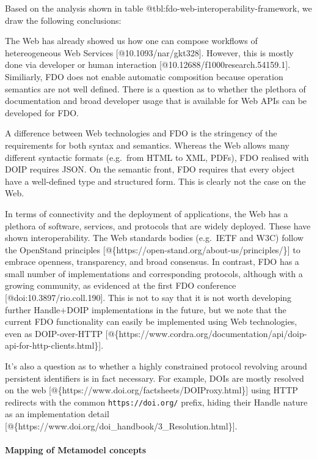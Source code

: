 Based on the analysis shown in table
@tbl:fdo-web-interoperability-framework, we draw the following
conclusions:

The Web has already showed us how one can compose workflows of
hetereogeneous Web Services {[}@10.1093/nar/gkt328{]}. However, this is
mostly done via developer or human interaction
{[}@10.12688/f1000research.54159.1{]}. Similiarly, FDO does not enable
automatic composition because operation semantics are not well defined.
There is a question as to whether the plethora of documentation and
broad developer usage that is available for Web APIs can be developed
for FDO.

A difference between Web technologies and FDO is the stringency of the
requirements for both syntax and semantics. Whereas the Web allows many
different syntactic formats (e.g.~from HTML to XML, PDFs), FDO realised
with DOIP requires JSON. On the semantic front, FDO requires that every
object have a well-defined type and structured form. This is clearly not
the case on the Web.

In terms of connectivity and the deployment of applications, the Web has
a plethora of software, services, and protocols that are widely
deployed. These have shown interoperability. The Web standards bodies
(e.g.~IETF and W3C) follow the OpenStand principles
{[}@\{https://open-stand.org/about-us/principles/\}{]} to embrace
openness, transparency, and broad consensus. In contrast, FDO has a
small number of implementations and corresponding protocols, although
with a growing community, as evidenced at the first FDO conference
{[}@doi:10.3897/rio.coll.190{]}. This is not to say that it is not worth
developing further Handle+DOIP implementations in the future, but we
note that the current FDO functionality can easily be implemented using
Web technologies, even as DOIP-over-HTTP
{[}@\{https://www.cordra.org/documentation/api/doip-api-for-http-clients.html\}{]}.

It's also a question as to whether a highly constrained protocol
revolving around persistent identifiers is in fact necessary. For
example, DOIs are mostly resolved on the web
{[}@\{https://www.doi.org/factsheets/DOIProxy.html\}{]} using HTTP
redirects with the common \texttt{https://doi.org/} prefix, hiding their
Handle nature as an implementation detail
{[}@\{https://www.doi.org/doi\_handbook/3\_Resolution.html\}{]}.

\hypertarget{mapping-of-metamodel-concepts}{%
\paragraph{Mapping of Metamodel
concepts}\label{mapping-of-metamodel-concepts}}

